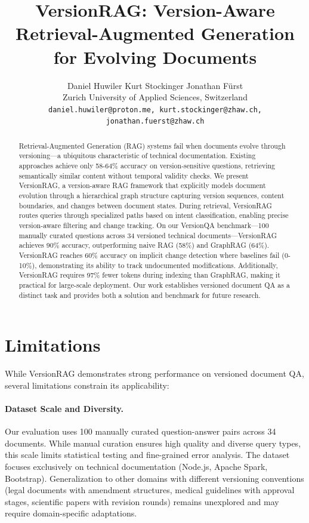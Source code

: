 \documentclass[11pt]{article}
\title{VersionRAG: Version-Aware Retrieval-Augmented Generation for Evolving Documents}
\author{
Daniel Huwiler \quad Kurt Stockinger \quad Jonathan Fürst \\
Zurich University of Applied Sciences, Switzerland \\
\texttt{daniel.huwiler@proton.me, kurt.stockinger@zhaw.ch, jonathan.fuerst@zhaw.ch}
}
\begin{document}
\maketitle


\begin{abstract}
Retrieval-Augmented Generation (RAG) systems fail when documents evolve through versioning—a ubiquitous characteristic of technical documentation. Existing approaches achieve only 58-64\% accuracy on version-sensitive questions, retrieving semantically similar content without temporal validity checks.
We present VersionRAG, a version-aware RAG framework that explicitly models document evolution through a hierarchical graph structure capturing version sequences, content boundaries, and changes between document states. During retrieval, VersionRAG routes queries through specialized paths based on intent classification, enabling precise version-aware filtering and change tracking.
On our VersionQA benchmark—100 manually curated questions across 34 versioned technical documents—VersionRAG achieves 90\% accuracy, outperforming naive RAG (58\%) and GraphRAG (64\%). VersionRAG reaches 60\% accuracy on implicit change detection where baselines fail (0-10\%), demonstrating its ability to track undocumented modifications. Additionally, VersionRAG requires 97\% fewer tokens during indexing than GraphRAG, making it practical for large-scale deployment. Our work establishes versioned document QA as a distinct task and provides both a solution and benchmark for future research.
\end{abstract}









\section*{Limitations}

While VersionRAG demonstrates strong performance on versioned document QA, several limitations constrain its applicability:

\paragraph{Dataset Scale and Diversity.}
Our evaluation uses 100 manually curated question-answer pairs across 34 documents. While manual curation ensures high quality and diverse query types, this scale limits statistical testing and fine-grained error analysis. The dataset focuses exclusively on technical documentation (Node.js, Apache Spark, Bootstrap). Generalization to other domains with different versioning conventions (legal documents with amendment structures, medical guidelines with approval stages, scientific papers with revision rounds) remains unexplored and may require domain-specific adaptations.
\end{document}
